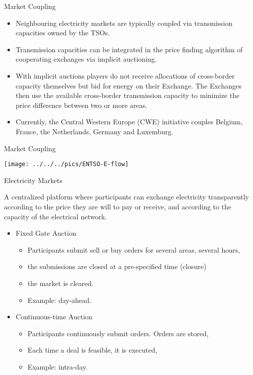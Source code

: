 {Market Coupling}
\begin{itemize}
\item<1-> Neighbouring electricity markets are typically coupled via transmission capacities owned by the TSOs.
\item<2->  Transmission capacities can be integrated in the price finding algorithm of cooperating exchanges via implicit auctioning.
\item<3-> With implicit auctions  players do not  receive allocations of cross-border capacity themselves but bid for energy on their Exchange. The Exchanges then use the available cross-border transmission capacity to minimize the price difference between two or more areas.
\item<4->  Currently, the Central Western Europe (CWE) initiative couples Belgium, France, the Netherlands, Germany and Luxemburg.
\end{itemize}

{Market Coupling}
\begin{center}
\texttt{[image: ../../../pics/ENTSO-E-flow]}
\end{center}

{Electricity Markets}

A centralized platform where participants can exchange electricity transparently
according to the price they are will to pay or receive, and according to the capacity of
the electrical network.

\begin{itemize}
\item<1-> Fixed Gate Auction
\begin{itemize}
\item Participants submit sell or buy orders for several areas, several hours,
\item the submissions are closed at a pre-specified time (closure)
\item the market is cleared.
\item Example: day-ahead.
\end{itemize}
\item<2-> Continuous-time Auction
\begin{itemize}
\item Participants continuously submit orders. Orders are stored,
\item Each time a deal is feasible, it is executed,
\item Example: intra-day.
\end{itemize}

\end{itemize}

